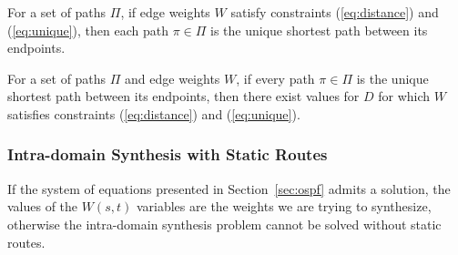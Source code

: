 \iffull
\begin{theorem}
For a set of paths $\Pi$, if edge weights 
$W$ satisfy constraints (\ref{eq:distance}) and (\ref{eq:unique}), then 
each path $\pi \in \Pi$ is the unique shortest path between its endpoints. 
\end{theorem}

\fi

\iffull
\begin{theorem}[Completeness]
For a set of paths $\Pi$ and edge weights $W$,
if every path $\pi \in \Pi$ is the unique shortest path between its endpoints,
then there exist values for $D$ for which
$W$ satisfies constraints (\ref{eq:distance}) and (\ref{eq:unique}). 
\end{theorem}

\fi


\subsubsection{Intra-domain Synthesis with Static Routes} \label{sec:ospfsr} 
\hspace*{4mm}

If the system of equations presented in Section~\ref{sec:ospf} admits a solution, 
the values of the $W(s,t)$ variables are the weights we are trying to synthesize,
otherwise the intra-domain synthesis problem 
cannot be solved without static routes.

